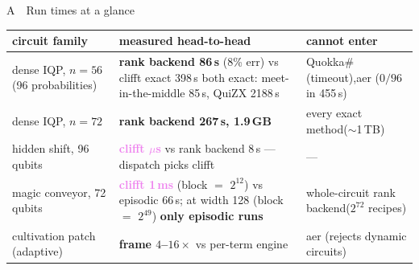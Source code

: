 \documentclass[aspectratio=169,11pt]{beamer}
\begin{document}
\begin{frame}{A \,\textperiodcentered\, Run times at a glance}
  \centering
  \small
  \begin{tabular}{@{}p{}p{}p{}@{}}
    \toprule
    \textbf{circuit family} & \textbf{measured head-to-head} & \textbf{cannot enter} \\
    \midrule
    dense IQP, $n{=}56$\newline\scriptsize(96 probabilities) &
    \textcolor{copper}{\textbf{rank backend 86\,s}} (8\% err) vs clifft exact 398\,s\newline
    {\scriptsize both exact: meet-in-the-middle 85\,s, QuiZX 2188\,s} &
    Quokka\# (timeout),\newline aer ($0/96$ in 455\,s) \\[2pt]
    dense IQP, $n{=}72$ &
    \textcolor{copper}{\textbf{rank backend 267\,s, 1.9\,GB}} &
    every exact method\newline($\sim$1\,TB) \\[2pt]
    hidden shift, 96 qubits &
    \textcolor{violet}{\textbf{clifft $\mu$s}} vs rank backend 8\,s --- dispatch picks clifft &
    --- \\[2pt]
    magic conveyor, 72 qubits &
    \textcolor{violet}{\textbf{clifft 1\,ms}} (block $=$ $2^{12}$) vs episodic 66\,s;\newline
    at width 128 (block $=$ $2^{49}$) \textcolor{copper}{\textbf{only episodic runs}} &
    whole-circuit rank backend\newline($2^{72}$ recipes) \\[2pt]
    cultivation patch (adaptive) &
    \textcolor{copper}{\textbf{frame $4$--$16\times$}} vs per-term engine &
    aer (rejects dynamic circuits) \\
    \bottomrule
  \end{tabular}
\end{frame}
\end{document}
